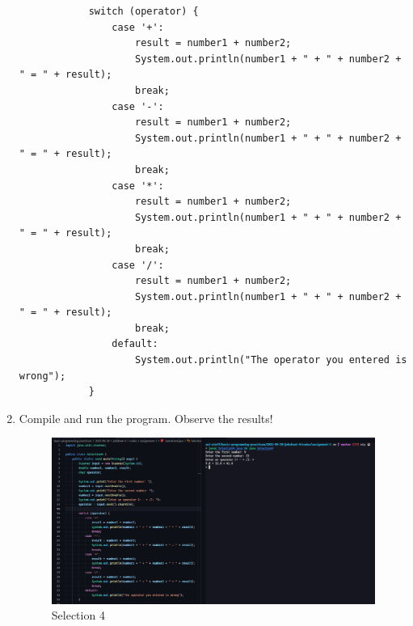 \documentclass[12pt,titlepage]{article}
\begin{document}
\begin{enumerate}
{        \begin{verbatim}
            switch (operator) {
                case '+':
                    result = number1 + number2;
                    System.out.println(number1 + " + " + number2 + " = " + result);
                    break;
                case '-':
                    result = number1 + number2;
                    System.out.println(number1 + " + " + number2 + " = " + result);
                    break;
                case '*':
                    result = number1 + number2;
                    System.out.println(number1 + " + " + number2 + " = " + result);
                    break;
                case '/':
                    result = number1 + number2;
                    System.out.println(number1 + " + " + number2 + " = " + result);
                    break;
                default:
                    System.out.println("The operator you entered is wrong");
            }
        \end{verbatim}
    }
    \pagebreak
    \item {
        Compile and run the program. Observe the results!

        \begin{figure}[h]
            \centering
            \includegraphics[width=.9\textwidth]{./images/selection-4.png}
            \caption{Selection 4}
        \end{figure}
    }
\end{enumerate}
\end{document}
